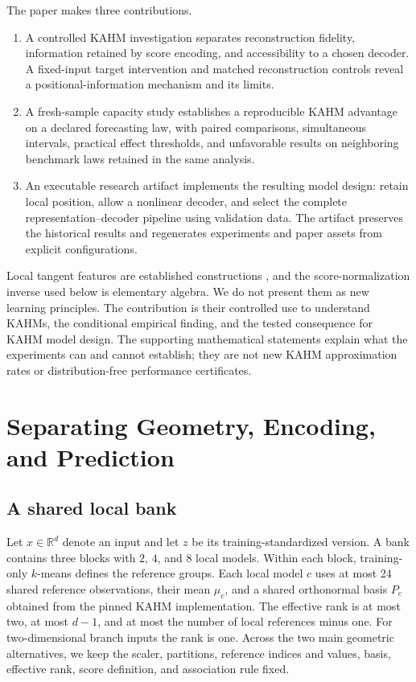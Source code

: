 \documentclass[10pt]{article}
\newcommand{\R}{\mathbb{R}}
\begin{document}
The paper makes three contributions.
\begin{enumerate}[leftmargin=*,itemsep=3pt]
\item A controlled KAHM investigation separates reconstruction fidelity,
      information retained by score encoding, and accessibility to a chosen
      decoder. A fixed-input target intervention and matched reconstruction
      controls reveal a positional-information mechanism and its limits.
\item A fresh-sample capacity study establishes a reproducible KAHM advantage
      on a declared forecasting law, with paired comparisons, simultaneous
      intervals, practical effect thresholds, and unfavorable results on
      neighboring benchmark laws retained in the same analysis.
\item An executable research artifact implements the resulting model design:
      retain local position, allow a nonlinear decoder, and select the complete
      representation--decoder pipeline using validation data. The artifact
      preserves the historical results and regenerates experiments and paper
      assets from explicit configurations.
\end{enumerate}

Local tangent features are established constructions
\citep{Yu2009LCC,Yu2010LTC}, and the score-normalization inverse used below
is elementary algebra. We do not present them as new learning principles.
The contribution is their controlled use to understand KAHMs,
the conditional empirical finding, and the tested consequence for KAHM
model design. The supporting mathematical statements explain what the
experiments can and cannot establish; they are not new KAHM approximation
rates or distribution-free performance certificates.



\section{Separating Geometry, Encoding, and Prediction}\label{sec:method}

\subsection{A shared local bank}

Let $x\in\R^d$ denote an input and let $z$ be its training-standardized
version. A bank contains three blocks with $2$, $4$, and $8$ local models.
Within each block, training-only $k$-means defines the reference groups.
Each local model $c$ uses at most 24 shared reference observations, their
mean $\mu_c$, and a shared orthonormal basis $P_c$ obtained from the pinned
KAHM implementation. The effective rank is at most two, at most $d-1$,
and at most the number of local references minus one. For two-dimensional
branch inputs the rank is one. Across the two main geometric alternatives,
we keep the scaler, partitions, reference indices and values, basis,
effective rank, score definition, and association rule fixed.
\end{document}
